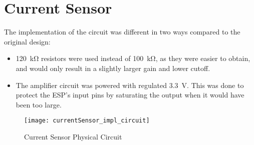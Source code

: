 \graphicspath{{content/4_implementation/figures/}}
\section{Current Sensor}

The implementation of the circuit was different in two ways compared to the original design:
\begin{itemize}
   \item \SI{120}{\kilo\ohm} resistors were used instead of \SI{100}{\kilo\ohm}, as they were easier to obtain, and would only result in a
         slightly larger gain and lower cutoff.
   \item The amplifier circuit was powered with regulated \SI{3.3}{V}. This was done to protect the ESP's input pins by saturating the output
         when it would have been too large.
\end{itemize}

\begin{figure}[!htb]
  \centering
  \texttt{[image: currentSensor\_impl\_circuit]}
  \caption{Current Sensor Physical Circuit}
\end{figure}